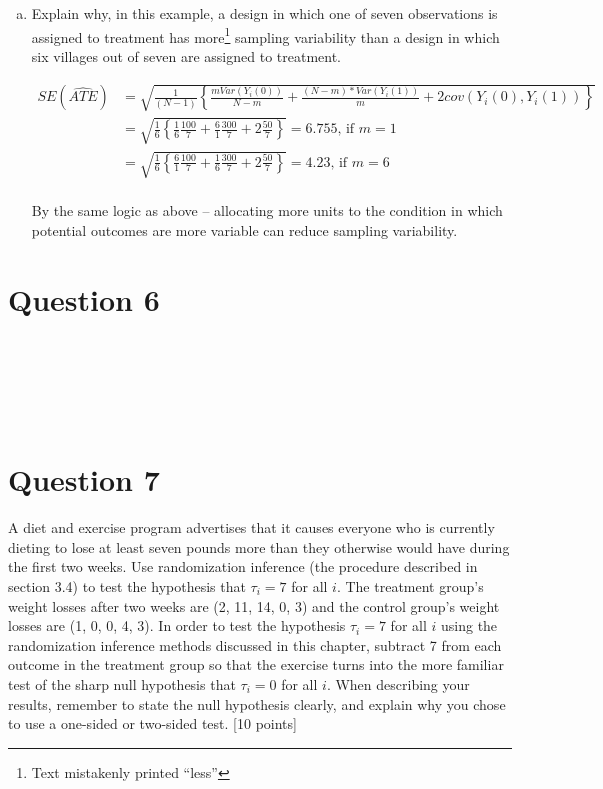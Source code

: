 \documentclass[11pt,notitlepage]{article}\usepackage[]{graphicx}\usepackage[]{color}
\makeatletter
\newenvironment{kframe}{%
 \def\at@end@of@kframe{}%
 \ifinner\ifhmode%
  \def\at@end@of@kframe{\end{minipage}}%
  \begin{minipage}{\columnwidth}%
 \fi\fi%
 \def\FrameCommand##1{\hskip\@totalleftmargin \hskip-\fboxsep
 \colorbox{shadecolor}{##1}\hskip-\fboxsep
     \hskip-\linewidth \hskip-\@totalleftmargin \hskip\columnwidth}%
 \MakeFramed {\advance\hsize-\width
   \@totalleftmargin\z@ \linewidth\hsize
   \@setminipage}}%
 {\par\unskip\endMakeFramed%
 \at@end@of@kframe}
\newenvironment{knitrout}{}{} %
\makeatother
\begin{document}
\begin{enumerate}[a)]
\item Explain why, in this example, a design in which one of seven observations is assigned to treatment has more\footnote{Text mistakenly printed ``less''} sampling variability than a design in which six villages out of seven are assigned to treatment.  

\begin{align*}
SE(\widehat{ATE}) &= \sqrt{\frac{1}{(N-1)} \left \{ \frac{mVar(Y_i (0))}{N- m} + \frac{(N-m)*Var(Y_i (1))}{m} + 2cov(Y_i(0), Y_i(1))\right \}} \\
&= \sqrt{\frac{1}{6} \left \{ \frac{1}{6}\frac{100}{7} + \frac{6}{1}\frac{300}{7} + 2\frac{50}{7}\right \}} = 6.755 \text{, if $m = 1$} \\
&= \sqrt{\frac{1}{6} \left \{ \frac{6}{1}\frac{100}{7} + \frac{1}{6}\frac{300}{7} + 2\frac{50}{7}\right \}} = 4.23 \text{, if $m = 6$} \\
\end{align*}

By the same logic as above -- allocating more units to the condition in which potential outcomes are more variable can reduce sampling variability.

\end{enumerate}

\section*{Question 6}
\begin{knitrout}
\color{fgcolor}\begin{kframe}
\begin{verbatim}






\end{verbatim}
\end{kframe}
\end{knitrout}

\section*{Question 7}
A diet and exercise program advertises that it causes everyone who is currently dieting to lose at least seven pounds more than they otherwise would have during the first two weeks.  Use randomization inference (the procedure described in section 3.4) to test the hypothesis that $\tau_i=7$ for all $i$.  The treatment group's weight losses after two weeks are (2, 11, 14, 0, 3) and the control group's weight losses are (1, 0, 0, 4, 3).  In order to test the hypothesis $\tau_i=7$ for all $i$ using the randomization inference methods discussed in this chapter, subtract 7 from each outcome in the treatment group so that the exercise turns into the more familiar test of the sharp null hypothesis that $\tau_i=0$ for all $i$. When describing your results, remember to state the null hypothesis clearly, and explain why you chose to use a one-sided or two-sided test. [10 points]
\end{document}
